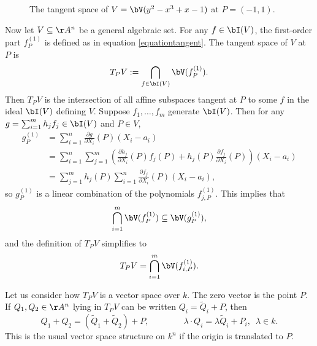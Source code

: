\documentclass[12pt]{amsart}
\theoremstyle{plain}
\begin{document}
\begin{figure}[h]
\centering
{}
\caption{The tangent space of $V = \bV(y^2 - x^3 + x - 1)$ at $P=(-1, 1)$.}
\label{figure:tangentspace}
\end{figure}

Now let $V\subseteq\AA^n$ be a general algebraic set.
For any $f\in\bI(V)$, the first-order part $f_P^{(1)}$ is defined as in equation \ref{equationtangent}.
The tangent space of $V$ at $P$ is
$$T_PV := \bigcap_{f\in\bI(V)} \bV(f_P^{(1)}).$$
Then $T_PV$ is the intersection of all affine subspaces tangent at $P$ to some $f$ in the ideal $\bI(V)$ defining $V$.
Suppose $f_1, \ldots, f_m$ generate $\bI(V)$.
Then for any $g = \sum_{i=1}^m h_j f_j \in \bI(V)$ and $P \in V$,
\begin{align*}
	g_P^{(1)} &= \sum_{i=1}^n \frac{\partial g}{\partial X_i}(P)(X_i-a_i) \\
		&= \sum_{i=1}^n \sum_{j=1}^m \left(\frac{\partial h_j}{\partial X_i}(P) f_j(P) + h_j(P) \frac{\partial f_j}{\partial X_i}(P)\right) (X_i-a_i) \\
		&= \sum_{j=1}^m h_j(P) \sum_{i=1}^n \frac{\partial f_j}{\partial X_i}(P)(X_i-a_i),
\end{align*}
so $g_P^{(1)}$ is a linear combination of the polynomials $f_{j,P}^{(1)}$.
This implies that 
$$\bigcap_{i=1}^m \bV(f_P^{(1)}) \subseteq \bV(g_P^{(1)}),$$
and the definition of $T_PV$ simplifies to
$$T_PV = \bigcap_{i=1}^m \bV(f_{i,P}^{(1)}).$$

Let us consider how $T_PV$ is a vector space over $k$.
The zero vector is the point $P$.
If $Q_1, Q_2 \in \AA^n$ lying in $T_PV$ can be written $Q_i = \tilde Q_i + P$, then
$$Q_1 + Q_2 = (\tilde Q_1 + \tilde Q_2) + P, \qquad\qquad \lambda \cdot Q_i = \lambda \tilde Q_i + P_i, \,\,\, \lambda \in k.$$
This is the usual vector space structure on $k^n$ if the origin is translated to $P$.
\end{document}
